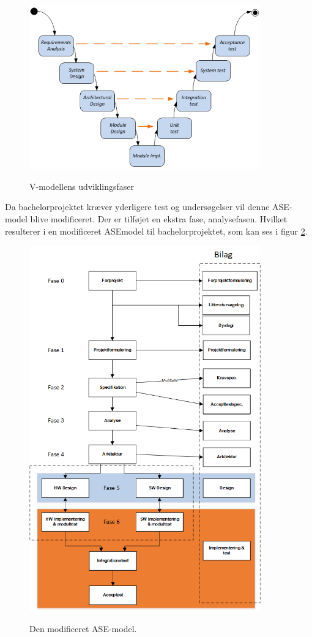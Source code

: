 \begin{figure}[H]
\centering
{\includegraphics[width=10cm]
{Figure/vmodel}}
\caption{V-modellens udviklingsfaser\cite{IngeniorhojskolenAarhusUniversiteta}}
\label{fig:vmodel}
\end{figure}

Da bachelorprojektet kræver yderligere test og undersøgelser vil denne ASE-model blive modificeret. Der er tilføjet en ekstra fase, analysefasen. Hvilket resulterer i en modificeret ASEmodel
til bachelorprojektet, som kan ses i figur \ref{fig:procesVoresASE}.

\begin{figure}[H]
\centering
{\includegraphics[width=10cm]
{Figure/procesVoresASE}}
\caption{Den modificeret ASE-model.}
\label{fig:procesVoresASE}
\end{figure}

